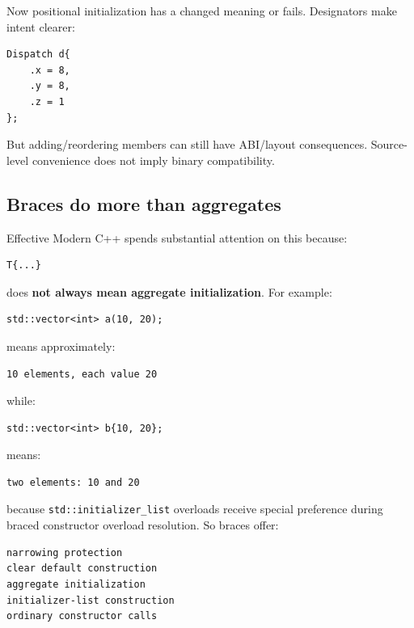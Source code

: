 Now positional initialization has a changed meaning or fails. Designators make intent clearer:

\begin{verbatim}
Dispatch d{
    .x = 8,
    .y = 8,
    .z = 1
};
\end{verbatim}

But adding/reordering members can still have ABI/layout consequences. Source-level convenience does not imply binary compatibility.

\subsection{Braces do more than aggregates}\label{01-foundations-i-ch003-braces-do-more-than-aggregates}

\hypertarget{01-foundations-i-ch003-braces-do-more-than-aggregates}{}

Effective Modern C++ spends substantial attention on this because:

\begin{verbatim}
T{...}
\end{verbatim}

does \textbf{not always mean aggregate initialization}. For example:

\begin{verbatim}
std::vector<int> a(10, 20);
\end{verbatim}

means approximately:

\begin{verbatim}
10 elements, each value 20
\end{verbatim}

while:

\begin{verbatim}
std::vector<int> b{10, 20};
\end{verbatim}

means:

\begin{verbatim}
two elements: 10 and 20
\end{verbatim}

because \texttt{std::initializer\_list} overloads receive special preference during braced constructor overload resolution. So braces offer:

\begin{verbatim}
narrowing protection
clear default construction
aggregate initialization
initializer-list construction
ordinary constructor calls
\end{verbatim}


